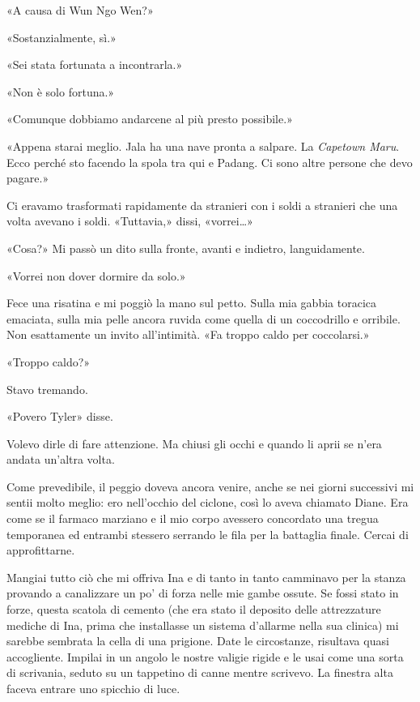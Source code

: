 «A causa di Wun Ngo Wen?»

«Sostanzialmente, sì.»

«Sei stata fortunata a incontrarla.»

«Non è solo fortuna.»

«Comunque dobbiamo andarcene al più presto possibile.»

«Appena starai meglio. Jala ha una nave pronta a salpare. La
\emph{Capetown Maru}. Ecco perché sto facendo la spola tra qui e Padang.
Ci sono altre persone che devo pagare.»

Ci eravamo trasformati rapidamente da stranieri con i soldi a stranieri
che una volta avevano i soldi. «Tuttavia,» dissi, «vorrei\ldots»

«Cosa?» Mi passò un dito sulla fronte, avanti e indietro, languidamente.

«Vorrei non dover dormire da solo.»

Fece una risatina e mi poggiò la mano sul petto. Sulla mia gabbia
toracica emaciata, sulla mia pelle ancora ruvida come quella di un
coccodrillo e orribile. Non esattamente un invito all'intimità. «Fa
troppo caldo per coccolarsi.»

«Troppo caldo?»

Stavo tremando.

«Povero Tyler» disse.

Volevo dirle di fare attenzione. Ma chiusi gli occhi e quando li aprii
se n'era andata un'altra volta.

\separatorefiori

Come prevedibile, il peggio doveva ancora venire, anche se nei giorni
successivi mi sentii molto meglio: ero nell'occhio del ciclone, così lo
aveva chiamato Diane. Era come se il farmaco marziano e il mio corpo
avessero concordato una tregua temporanea ed entrambi stessero serrando
le fila per la battaglia finale. Cercai di approfittarne.

Mangiai tutto ciò che mi offriva Ina e di tanto in tanto camminavo per
la stanza provando a canalizzare un po' di forza nelle mie gambe ossute.
Se fossi stato in forze, questa scatola di cemento (che era stato il
deposito delle attrezzature mediche di Ina, prima che installasse un
sistema d'allarme nella sua clinica) mi sarebbe sembrata la cella di una
prigione. Date le circostanze, risultava quasi accogliente. Impilai in
un angolo le nostre valigie rigide e le usai come una sorta di
scrivania, seduto su un tappetino di canne mentre scrivevo. La finestra
alta faceva entrare uno spicchio di luce.

